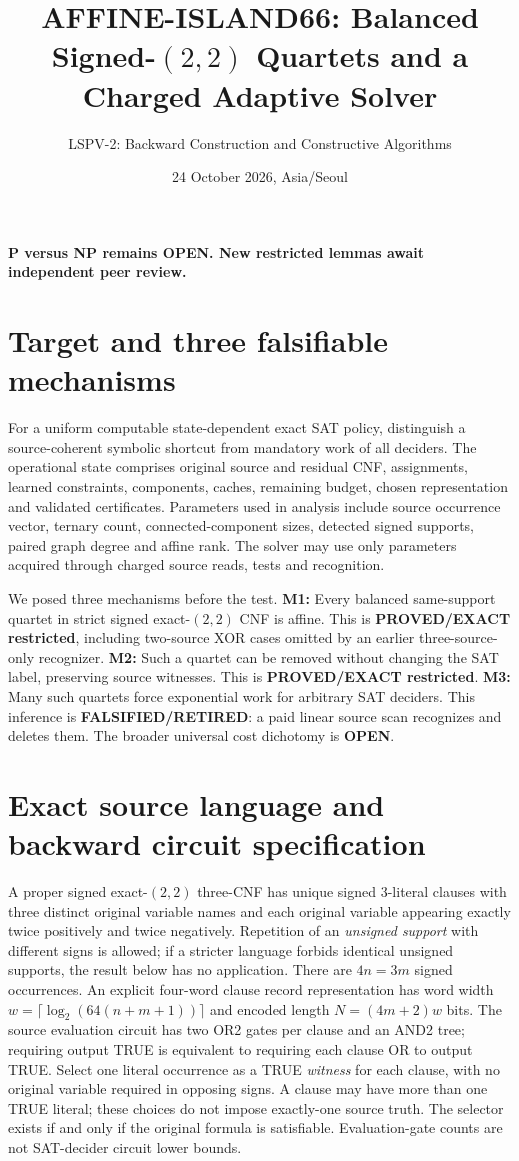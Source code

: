 \documentclass[11pt]{article}
\title{AFFINE-ISLAND66: Balanced Signed-$(2,2)$ Quartets and a Charged Adaptive Solver}
\author{LSPV-2: Backward Construction and Constructive Algorithms}
\date{24 October 2026, Asia/Seoul}
\begin{document}
\maketitle
\begin{center}\textbf{P versus NP remains OPEN. New restricted lemmas await independent peer review.}\end{center}
\section{Target and three falsifiable mechanisms}
For a uniform computable state-dependent exact SAT policy, distinguish a source-coherent symbolic shortcut from mandatory work of all deciders. The operational state comprises original source and residual CNF, assignments, learned constraints, components, caches, remaining budget, chosen representation and validated certificates. Parameters used in analysis include source occurrence vector, ternary count, connected-component sizes, detected signed supports, paired graph degree and affine rank. The solver may use only parameters acquired through charged source reads, tests and recognition.

We posed three mechanisms before the test. \textbf{M1:} Every balanced same-support quartet in strict signed exact-$(2,2)$ CNF is affine. This is \textbf{PROVED/EXACT restricted}, including two-source XOR cases omitted by an earlier three-source-only recognizer. \textbf{M2:} Such a quartet can be removed without changing the SAT label, preserving source witnesses. This is \textbf{PROVED/EXACT restricted}. \textbf{M3:} Many such quartets force exponential work for arbitrary SAT deciders. This inference is \textbf{FALSIFIED/RETIRED}: a paid linear source scan recognizes and deletes them. The broader universal cost dichotomy is \textbf{OPEN}.

\section{Exact source language and backward circuit specification}
A proper signed exact-$(2,2)$ three-CNF has unique signed 3-literal clauses with three distinct original variable names and each original variable appearing exactly twice positively and twice negatively. Repetition of an \emph{unsigned support} with different signs is allowed; if a stricter language forbids identical unsigned supports, the result below has no application. There are $4n=3m$ signed occurrences. An explicit four-word clause record representation has word width $w=\lceil\log_2(64(n+m+1))\rceil$ and encoded length $N=(4m+2)w$ bits. The source evaluation circuit has two OR2 gates per clause and an AND2 tree; requiring output TRUE is equivalent to requiring each clause OR to output TRUE. Select one literal occurrence as a TRUE \emph{witness} for each clause, with no original variable required in opposing signs. A clause may have more than one TRUE literal; these choices do not impose exactly-one source truth. The selector exists if and only if the original formula is satisfiable. Evaluation-gate counts are not SAT-decider circuit lower bounds.
\end{document}
